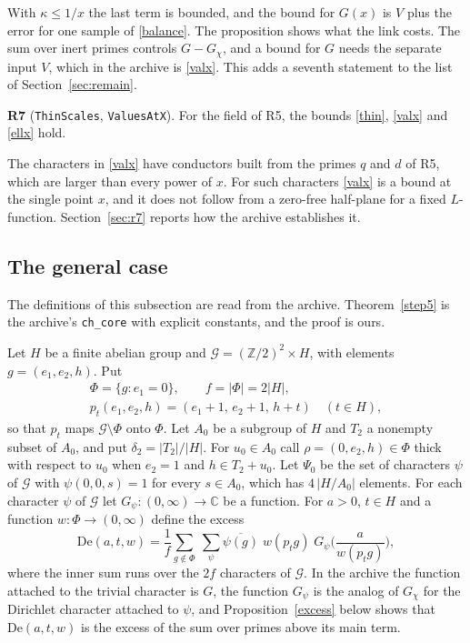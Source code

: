 \documentclass[11pt,letterpaper]{article}
\numberwithin{equation}{section}
\begin{document}
With $\kappa\le1/x$ the last term is bounded, and the bound for $G(x)$ is $V$ plus the error for one sample of \eqref{balance}. The proposition shows what the link costs. The sum over inert primes controls $G-G_\chi$, and a bound for $G$ needs the separate input $V$, which in the archive is \eqref{valx}. This adds a seventh statement to the list of Section~\ref{sec:remain}.

\medskip\noindent\textbf{R7} (\texttt{ThinScales}, \texttt{ValuesAtX}). For the field of R5, the bounds \eqref{thin}, \eqref{valx} and \eqref{ellx} hold.

\medskip
The characters in \eqref{valx} have conductors built from the primes $q$ and $d$ of R5, which are larger than every power of $x$. For such characters \eqref{valx} is a bound at the single point $x$, and it does not follow from a zero-free half-plane for a fixed $L$-function. Section~\ref{sec:r7} reports how the archive establishes it.

\subsection{The general case}\label{sec:step5}

The definitions of this subsection are read from the archive. Theorem~\ref{step5} is the archive's \texttt{ch\_core} with explicit constants, and the proof is ours.

Let $H$ be a finite abelian group and $\mathcal G=(\mathbb Z/2)^2\times H$, with elements $g=(e_1,e_2,h)$. Put
\begin{gather*}
\Phi=\{g:e_1=0\},\qquad f=|\Phi|=2|H|,\\
p_t(e_1,e_2,h)=(e_1+1,\,e_2+1,\,h+t)\quad(t\in H),
\end{gather*}
so that $p_t$ maps $\mathcal G\setminus\Phi$ onto $\Phi$. Let $A_0$ be a subgroup of $H$ and $T_2$ a nonempty subset of $A_0$, and put $\delta_2=|T_2|/|H|$. For $u_0\in A_0$ call $\rho=(0,e_2,h)\in\Phi$ thick with respect to $u_0$ when $e_2=1$ and $h\in T_2+u_0$. Let $\Psi_0$ be the set of characters $\psi$ of $\mathcal G$ with $\psi(0,0,s)=1$ for every $s\in A_0$, which has $4\,|H/A_0|$ elements. For each character $\psi$ of $\mathcal G$ let $G_\psi\colon(0,\infty)\to\mathbb C$ be a function. For $a>0$, $t\in H$ and a function $w\colon\Phi\to(0,\infty)$ define the excess
\[
\mathrm{De}(a,t,w)=\frac1f\sum_{g\notin\Phi}\ \sum_\psi\overline{\psi(g)}\;w(p_tg)\;G_\psi\Big(\frac a{w(p_tg)}\Big),
\]
where the inner sum runs over the $2f$ characters of $\mathcal G$. In the archive the function attached to the trivial character is $G$, the function $G_\psi$ is the analog of $G_\chi$ for the Dirichlet character attached to $\psi$, and Proposition~\ref{excess} below shows that $\mathrm{De}(a,t,w)$ is the excess of the sum over primes above its main term.
\end{document}
